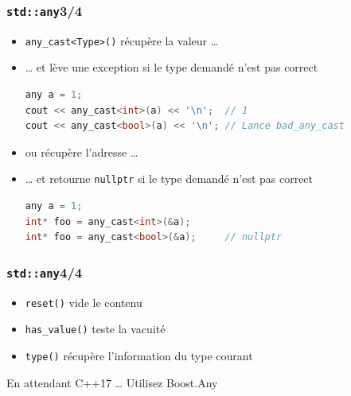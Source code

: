 \documentclass[C++.tex]{subfiles}
\begin{document}
\begin{frame}[fragile]
	\frametitle{\lstinline|std::any|\titlehfill{}3/4}
	\begin{itemize}
		\item \lstinline|any_cast<Type>()| récupère la valeur \ldots
		\item \ldots{} et lève une exception si le type demandé n'est pas correct

		\begin{lstlisting}[language=C++]
any a = 1;
cout << any_cast<int>(a) << '\n';  // 1
cout << any_cast<bool>(a) << '\n'; // Lance bad_any_cast\end{lstlisting}

		\item ou récupère l'adresse \ldots
		\item \ldots{} et retourne \lstinline|nullptr| si le type demandé n'est pas correct

		\begin{lstlisting}[language=C++]
any a = 1;
int* foo = any_cast<int>(&a);
int* foo = any_cast<bool>(&a);     // nullptr\end{lstlisting}
	\end{itemize}
\end{frame}

\begin{frame}[fragile]
	\frametitle{\lstinline|std::any|\titlehfill{}4/4}
	\begin{itemize}
		\item \lstinline|reset()| vide le contenu
		\item \lstinline|has_value()| teste la vacuité
		\item \lstinline|type()| récupère l'information du type courant
	\end{itemize}

	\begin{block}{En attendant C++17 \ldots}
		Utilisez Boost.Any
	\end{block}
\end{frame}
\end{document}
